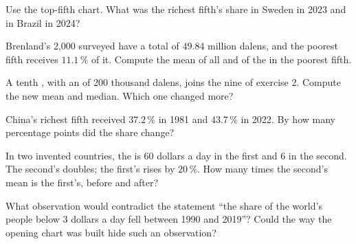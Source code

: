 \begin{exercise}[$\star$]\label{exo:g9:income-distribution:4}
Use the top-fifth chart. What was the richest fifth's share in Sweden in 2023 and in Brazil in 2024?
\end{exercise}

\begin{exercise}[$\star\star$]\label{exo:g9:income-distribution:5}
Brenland's 2,000 surveyed  have a total  of $49.84$ million dalens, and the
poorest fifth receives $11.1\,\%$ of it. Compute the mean  of all  and of the
 in the poorest fifth.
\end{exercise}

\begin{exercise}[$\star\star$]\label{exo:g9:income-distribution:6}
A tenth , with an  of 200 thousand dalens, joins the nine  of exercise 2. Compute
the new mean and median. Which one changed more?
\end{exercise}

\begin{exercise}[$\star\star$]\label{exo:g9:income-distribution:7}
China's richest fifth received $37.2\,\%$ in 1981 and $43.7\,\%$ in 2022. By how many percentage points did
the share change?
\end{exercise}

\begin{exercise}[$\star\star$]\label{exo:g9:income-distribution:8}
In two invented countries, the  is 60 dollars a day in the first and 6 in the second. The
second's  doubles; the first's rises by $20\,\%$. How many times the second's mean is the first's,
before and after?
\end{exercise}

\begin{exercise}[$\star\star$]\label{exo:g9:income-distribution:9}
What observation would contradict the statement ``the share of the world's people below 3 dollars a day fell
between 1990 and 2019''? Could the way the opening chart was built hide such an observation?
\end{exercise}

